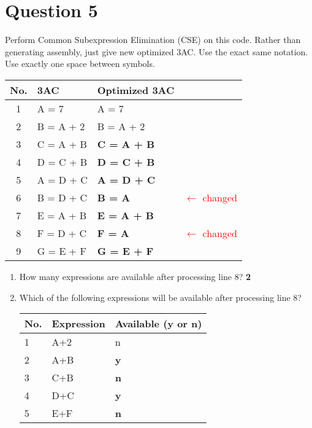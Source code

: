 \documentclass{article}
\newcommand{\textr}[1]{\textcolor{red}{#1}}
\begin{document}
\section*{Question 5}
Perform Common Subexpression Elimination (CSE) on this code. Rather than generating assembly, just give new optimized 3AC. Use the exact same notation. Use exactly one space between symbols.
\vspace{-1em}
\begin{multicols}{2}
\begin{tabular}{|c|l|l|l}
  \hline
  \textbf{No.} & \textbf{3AC} & \textbf{Optimized 3AC} \\
  \hline
  1   & A = 7       & A = 7 \\
  \hline
  2   & B = A + 2   & B = A + 2 \\
  \hline
  3   & C = A + B   & \textbf{C = A + B} \\
  \hline
  4   & D = C + B   & \textbf{D = C + B} \\
  \hline
  5   & A = D + C   & \textbf{A = D + C} \\
  \hline
  6   & B = D + C   & \textbf{B = A} & \textr{$\leftarrow$ changed} \\
  \hline
  7   & E = A + B   & \textbf{E = A + B} & \\
  \hline
  8   & F = D + C   & \textbf{F = A} & \textr{$\leftarrow$ changed} \\
  \hline
  9   & G = E + F   & \textbf{G = E + F} \\
  \hline
\end{tabular}
\begin{enumerate}
  \item How many expressions are available after processing line 8? \textbf{2} \\
  \item Which of the following expressions will be available after processing line 8?
  \begin{tabular}{|l|l|l|}
  \hline
  \textbf{No.} & \textbf{Expression} & \textbf{Available (y or n)} \\
  \hline
  1 & A+2 & n \\
  \hline
  2 & A+B & \textbf{y} \\
  \hline
  3 & C+B & \textbf{n} \\
  \hline
  4 & D+C & \textbf{y} \\
  \hline
  5 & E+F & \textbf{n} \\
  \hline
  \end{tabular}
\end{enumerate}
\end{multicols}
\end{document}
